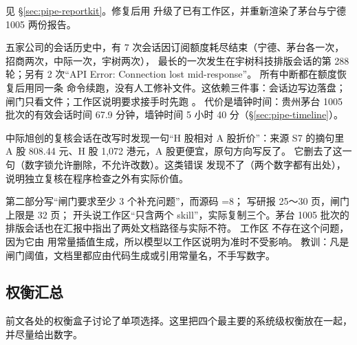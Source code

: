 \begin{failcase}
见 \S\ref{sec:pipe-reportkit}。修复后用  升级了已有工作区，并重新渲染了茅台与宁德 1005 两份报告。
\end{failcase}

\begin{failcase}[ 7：额度耗尽与连接中断]
五家公司的会话历史中，有 7 次会话因订阅额度耗尽结束（宁德、茅台各一次，招商两次，中际一次，宇树两次），
最长的一次发生在宇树科技排版会话的第 288 轮；另有 2 次“API Error: Connection lost mid-response”。
所有中断都在额度恢复后用同一条  命令续跑，没有人工修补文件。这依赖三件事：会话边写边落盘；闸门只看文件；工作区说明要求接手时先跑 。
代价是墙钟时间：贵州茅台 1005 批次的有效会话时间 67.9 分钟，墙钟时间 5 小时 40 分（\S\ref{sec:pipe-timeline}）。
\end{failcase}

\begin{failcase}[ 8：复核会话发现方向写反]
中际旭创的复核会话在改写时发现一句“H 股相对 A 股折价”：来源 S7 的摘句里 A 股 808.44 元、H 股 1,072 港元，A 股更便宜，原句方向写反了。
它删去了这一句（数字锁允许删除，不允许改数）。这类错误  发现不了（两个数字都有出处），说明独立复核在程序检查之外有实际价值。
\end{failcase}

\begin{failcase}[ 9：手写文档与闸门常量漂移]
 第二部分写“闸门要求至少 3 个补充问题”，而源码 =8； 写研报 25～30 页，闸门上限是 32 页；
 开头说工作区“只含两个 skill”，实际复制三个。茅台 1005 批次的排版会话也在汇报中指出了两处文档路径与实际不符。
工作区  不存在这个问题，因为它由  用常量插值生成，所以模型以工作区说明为准时不受影响。
教训：凡是闸门阈值，文档里都应由代码生成或引用常量名，不手写数字。
\end{failcase}

\subsection{权衡汇总}
\label{sec:pipe-tradeoffs}

前文各处的权衡盒子讨论了单项选择。这里把四个最主要的系统级权衡放在一起，并尽量给出数字。

